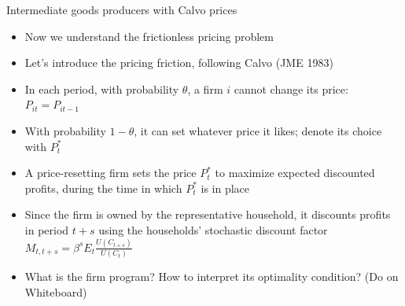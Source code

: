 \documentclass[9pt,xcolor={dvipsnames}]{beamer}
\newcommand{\bit}{\begin{itemize}}
\newcommand{\eit}{\end{itemize}}
\newcommand{\rc}{\color{red}}
\begin{document}
\begin{frame}{Intermediate goods producers with Calvo prices}

\bit
\setlength\itemsep{1.5em}

\item Now we understand the frictionless pricing problem

\item Let's introduce the pricing friction, following Calvo (JME 1983)

\item In each period, with probability $\theta$, a firm $i$ cannot change its price: $P_{it} = P_{it-1}$

\item With probability $1-\theta$, it can set whatever price it likes; denote its choice with $P^*_t$

\item A price-resetting firm sets the price $P^*_t$ to maximize expected discounted profits, during the time in which $P^*_t$ is in place

\item Since the firm is owned by the representative household, it discounts profits in period $t+s$ using the households' stochastic discount factor $M_{t,t+s}=\beta^s E_t \frac{U(C_{t+s})}{U(C_t)}$

\item What is the firm program? How to interpret its optimality condition? {\rc (Do on Whiteboard)}
\eit

\end{frame}


%
%
%
%
%
%
\end{document}
